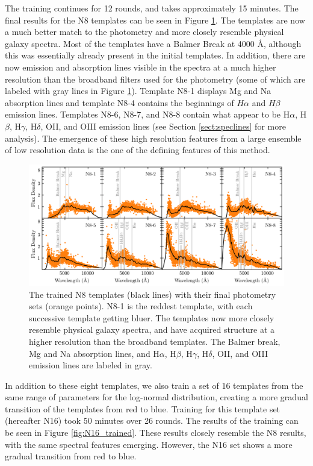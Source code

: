 \documentclass[twocolumn]{aastex63}
\begin{document}
    The training continues for 12 rounds, and takes approximately 15 minutes.
    The final results for the N8 templates can be seen in Figure \ref{fig:N8_trained}.
    The templates are now a much better match to the photometry and more closely resemble physical galaxy spectra.
    Most of the templates have a Balmer Break at 4000 \AA, although this was essentially already present in the initial templates.
    In addition, there are now emission and absorption lines visible in the spectra at a much higher resolution than the broadband filters used for the photometry (some of which are labeled with gray lines in Figure \ref{fig:N8_trained}).
    Template N8-1 displays Mg and Na absorption lines and template N8-4 contains the beginnings of $H\alpha$ and $H\beta$ emission lines.
    Templates N8-6, N8-7, and N8-8 contain what appear to be H$\alpha$, H$\beta$, H$\gamma$, H$\delta$, OII, and OIII emission lines (see Section \ref{sect:speclines} for more analysis).
    The emergence of these high resolution features from a large ensemble of low resolution data is the one of the defining features of this method.

    \begin{figure}
        \centering
        \includegraphics{N8_trained.png}
        \caption{The trained N8 templates (black lines) with their final photometry sets (orange points). N8-1 is the reddest template, with each successive template getting bluer. The templates now more closely resemble physical galaxy spectra, and have acquired structure at a higher resolution than the broadband templates. The Balmer break, Mg and Na absorption lines, and H$\alpha$, H$\beta$, H$\gamma$, H$\delta$, OII, and OIII emission lines are labeled in gray.}
        \label{fig:N8_trained}
    \end{figure}

    In addition to these eight templates, we also train a set of 16 templates from the same range of parameters for the log-normal distribution, creating a more gradual transition of the templates from red to blue. 
    Training for this template set (hereafter N16) took 50 minutes over 26 rounds.
    The results of the training can be seen in Figure \ref{fig:N16_trained}.
    These results closely resemble the N8 results, with the same spectral features emerging.
    However, the N16 set shows a more gradual transition from red to blue.
\end{document}
